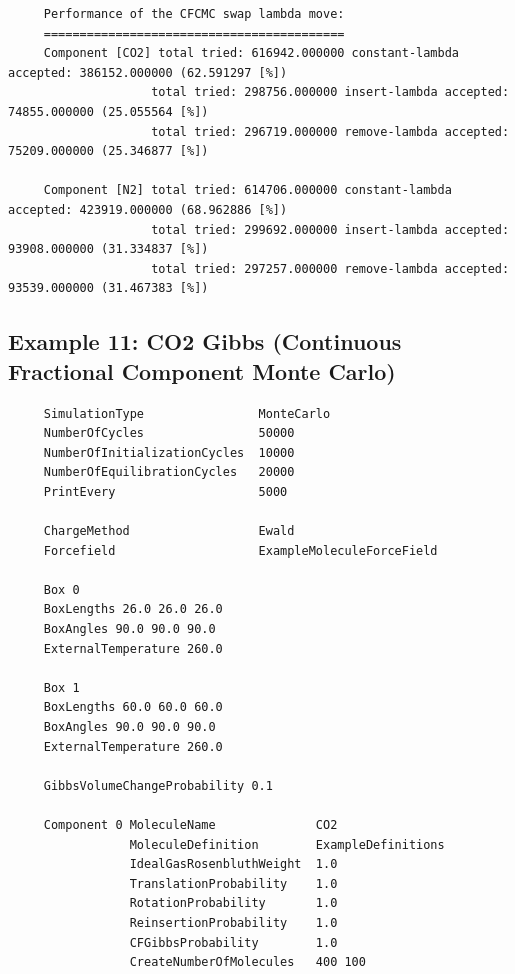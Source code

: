 \begin{tiny}
\begin{verbatim}
     Performance of the CFCMC swap lambda move:
     ==========================================
     Component [CO2] total tried: 616942.000000 constant-lambda accepted: 386152.000000 (62.591297 [%])
                    total tried: 298756.000000 insert-lambda accepted: 74855.000000 (25.055564 [%])
                    total tried: 296719.000000 remove-lambda accepted: 75209.000000 (25.346877 [%])
     
     Component [N2] total tried: 614706.000000 constant-lambda accepted: 423919.000000 (68.962886 [%])
                    total tried: 299692.000000 insert-lambda accepted: 93908.000000 (31.334837 [%])
                    total tried: 297257.000000 remove-lambda accepted: 93539.000000 (31.467383 [%])
\end{verbatim}
\end{tiny}

\subsection*{Example 11: CO2 Gibbs (Continuous Fractional Component Monte Carlo)}

\begin{tiny}
\begin{verbatim}
     SimulationType                MonteCarlo
     NumberOfCycles                50000
     NumberOfInitializationCycles  10000
     NumberOfEquilibrationCycles   20000
     PrintEvery                    5000
     
     ChargeMethod                  Ewald
     Forcefield                    ExampleMoleculeForceField
     
     Box 0
     BoxLengths 26.0 26.0 26.0
     BoxAngles 90.0 90.0 90.0
     ExternalTemperature 260.0
     
     Box 1
     BoxLengths 60.0 60.0 60.0
     BoxAngles 90.0 90.0 90.0
     ExternalTemperature 260.0
     
     GibbsVolumeChangeProbability 0.1
     
     Component 0 MoleculeName              CO2
                 MoleculeDefinition        ExampleDefinitions
                 IdealGasRosenbluthWeight  1.0
                 TranslationProbability    1.0
                 RotationProbability       1.0
                 ReinsertionProbability    1.0
                 CFGibbsProbability        1.0
                 CreateNumberOfMolecules   400 100
\end{verbatim}
\end{tiny}

